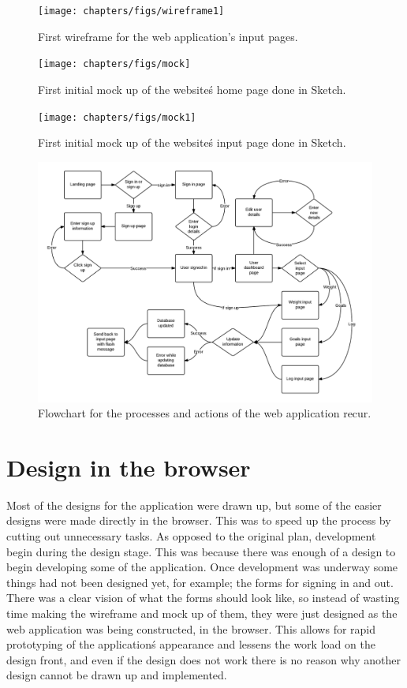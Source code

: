 \begin{figure}[!ht]
\centering
\texttt{[image: chapters/figs/wireframe1]}
\caption{First wireframe for the web application's input pages.}
\label{fig:erd}
\end{figure}

\begin{figure}[!ht]
\centering
\texttt{[image: chapters/figs/mock]}
\caption{First initial mock up of the website\'s home page done in Sketch.}
\label{fig:erd}
\end{figure}

\begin{figure}[!ht]
\centering
\texttt{[image: chapters/figs/mock1]}
\caption{First initial mock up of the website\'s input page done in Sketch.}
\label{fig:erd}
\end{figure}

\begin{figure}[!ht]
\centering
\includegraphics[scale=0.3]{chapters/figs/flowchart}
\caption{Flowchart for the processes and actions of the web application recur.}
\label{fig:flowchart}
\end{figure}

\section{Design in the browser}
Most of the designs for the application were drawn up, but some of the easier designs were made directly in the browser. This was to speed up the process by cutting out unnecessary tasks. As opposed to the original plan, development begin during the design stage. This was because there was enough of a design to begin developing some of the application. Once development was underway some things had not been designed yet, for example; the forms for signing in and out. There was a clear vision of what the forms should look like, so instead of wasting time making the wireframe and mock up of them, they were just designed as the web application was being constructed, in the browser. This allows for rapid prototyping of the application\'s appearance and lessens the work load on the design front, and even if the design does not work there is no reason why another design cannot be drawn up and implemented.\\

